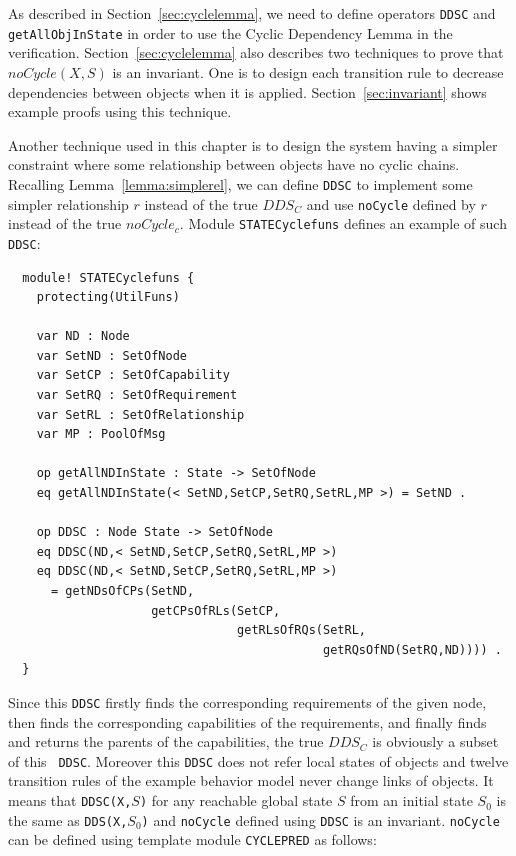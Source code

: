 \documentclass[12pt]{report}
\newcommand{\stt}[1]{{\small{\tt {#1}}}}
\begin{document}
As described in Section~\ref{sec:cyclelemma}, we need to define
operators {\tt DDSC} and {\tt getAllObjInState} in order to use the
Cyclic Dependency Lemma in the
verification. Section~\ref{sec:cyclelemma} also describes two
techniques to prove that $noCycle(X,S)$ is an invariant. One is to
design each transition rule to decrease dependencies between objects
when it is applied. Section~\ref{sec:invariant} shows example proofs
using this technique.

Another technique used in this chapter is to design the system having
a simpler constraint where some relationship between objects have no
cyclic chains. Recalling Lemma~\ref{lemma:simplerel}, we can define
{\tt DDSC} to implement some simpler relationship $r$ instead of the
true $DDS_C$ and use {\tt noCycle} defined by $r$ instead of the true
$noCycle_c$. Module {\tt STATECyclefuns} defines an example of such
{\tt DDSC}:
\small
\begin{verbatim}
  module! STATECyclefuns {
    protecting(UtilFuns)
  
    var ND : Node
    var SetND : SetOfNode
    var SetCP : SetOfCapability
    var SetRQ : SetOfRequirement
    var SetRL : SetOfRelationship
    var MP : PoolOfMsg
  
    op getAllNDInState : State -> SetOfNode
    eq getAllNDInState(< SetND,SetCP,SetRQ,SetRL,MP >) = SetND .
  
    op DDSC : Node State -> SetOfNode
    eq DDSC(ND,< SetND,SetCP,SetRQ,SetRL,MP >)
    eq DDSC(ND,< SetND,SetCP,SetRQ,SetRL,MP >)
      = getNDsOfCPs(SetND,
                    getCPsOfRLs(SetCP,
                                getRLsOfRQs(SetRL,
                                            getRQsOfND(SetRQ,ND)))) .
  }
\end{verbatim}
\normalsize
Since this {\tt DDSC} firstly finds the corresponding requirements of
the given node, then finds the corresponding capabilities of the
requirements, and finally finds and returns the parents of the
capabilities, the true $DDS_C$ is obviously a subset of this {\tt
  DDSC}.  Moreover this {\tt DDSC} does not refer local states of
objects and twelve transition rules of the example behavior model
never change links of objects. It means that \stt{DDSC(X,$S$)} for any
reachable global state $S$ from an initial state $S_0$ is the same as
\stt{DDS(X,$S_0$)} and {\tt noCycle} defined using {\tt DDSC} is an
invariant. {\tt noCycle} can be defined using template module {\tt CYCLEPRED}
as follows:
\end{document}
